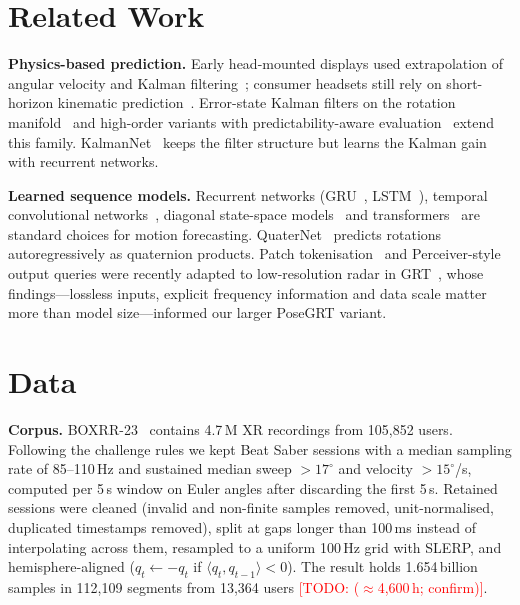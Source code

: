 \documentclass[conference]{IEEEtran}
\newcommand{\todo}[1]{\textcolor{red}{[TODO: #1]}}
\begin{document}
\section{Related Work}
\textbf{Physics-based prediction.} Early head-mounted displays used extrapolation of angular velocity and Kalman
filtering~\cite{azuma1995}; consumer headsets still rely on short-horizon kinematic prediction~\cite{lavalle2014}.
Error-state Kalman filters on the rotation manifold~\cite{sola2017} and high-order variants with predictability-aware
evaluation~\cite{zhong2025} extend this family. KalmanNet~\cite{revach2022} keeps the filter structure but learns the Kalman
gain with recurrent networks.

\textbf{Learned sequence models.} Recurrent networks (GRU~\cite{cho2014}, LSTM~\cite{hochreiter1997}), temporal
convolutional networks~\cite{bai2018}, diagonal state-space models~\cite{gu2022s4d} and transformers~\cite{vaswani2017} are
standard choices for motion forecasting. QuaterNet~\cite{pavllo2018} predicts rotations autoregressively as quaternion
products. Patch tokenisation~\cite{dosovitskiy2021} and Perceiver-style output queries were recently adapted to
low-resolution radar in GRT~\cite{huang2025grt}, whose findings---lossless inputs, explicit frequency information and data
scale matter more than model size---informed our larger PoseGRT variant.

\section{Data}
\label{sec:data}
\textbf{Corpus.} BOXRR-23~\cite{nair2024boxrr} contains 4.7\,M XR recordings from 105{,}852 users. Following the challenge
rules we kept Beat Saber sessions with a median sampling rate of 85--110\,Hz and sustained median sweep
$>17^\circ$ and velocity $>15^\circ$/s, computed per 5\,s window on Euler angles after discarding the first 5\,s. Retained
sessions were cleaned (invalid and non-finite samples removed, unit-normalised, duplicated timestamps removed), split at
gaps longer than 100\,ms instead of interpolating across them, resampled to a uniform 100\,Hz grid with SLERP, and
hemisphere-aligned ($q_t \leftarrow -q_t$ if $\langle q_t, q_{t-1}\rangle<0$). The result holds 1.654\,billion samples in
112{,}109 segments from 13{,}364 users \todo{($\approx$4{,}600\,h; confirm)}.
\end{document}
